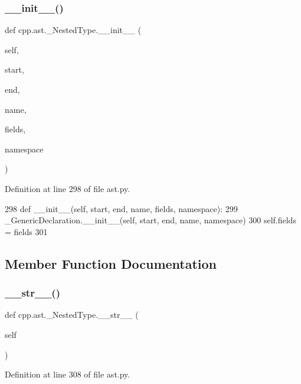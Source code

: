 \subsubsection{\texorpdfstring{\+\_\+\+\_\+init\+\_\+\+\_\+()}{\_\_init\_\_()}}
{\footnotesize\ttfamily def cpp.\+ast.\+\_\+\+Nested\+Type.\+\_\+\+\_\+init\+\_\+\+\_\+ (\begin{DoxyParamCaption}\item[{}]{self,  }\item[{}]{start,  }\item[{}]{end,  }\item[{}]{name,  }\item[{}]{fields,  }\item[{}]{namespace }\end{DoxyParamCaption})}



Definition at line 298 of file ast.\+py.


\begin{DoxyCode}
298     \textcolor{keyword}{def }\_\_init\_\_(self, start, end, name, fields, namespace):
299         \_GenericDeclaration.\_\_init\_\_(self, start, end, name, namespace)
300         self.fields = fields
301 
\end{DoxyCode}


\subsection{Member Function Documentation}
\mbox{\label{classcpp_1_1ast_1_1__NestedType_a18901ec6acba88c526d703444bf4d52c}} 
\subsubsection{\texorpdfstring{\+\_\+\+\_\+str\+\_\+\+\_\+()}{\_\_str\_\_()}}
{\footnotesize\ttfamily def cpp.\+ast.\+\_\+\+Nested\+Type.\+\_\+\+\_\+str\+\_\+\+\_\+ (\begin{DoxyParamCaption}\item[{}]{self }\end{DoxyParamCaption})}



Definition at line 308 of file ast.\+py.



